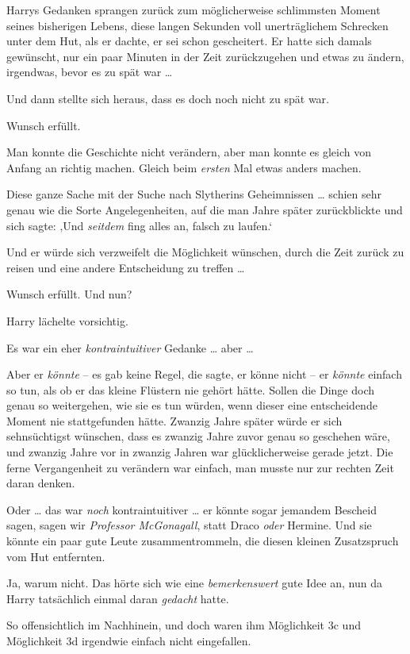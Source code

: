 Harrys Gedanken sprangen zurück zum möglicherweise schlimmsten Moment seines bisherigen Lebens, diese langen Sekunden voll unerträglichem Schrecken unter dem Hut, als er dachte, er sei schon gescheitert. Er hatte sich damals gewünscht, nur ein paar Minuten in der Zeit zurückzugehen und etwas zu ändern, irgendwas, bevor es zu spät war …

Und dann stellte sich heraus, dass es doch noch nicht zu spät war.

Wunsch erfüllt.

Man konnte die Geschichte nicht verändern, aber man konnte es gleich von Anfang an richtig machen. Gleich beim \emph{ersten} Mal etwas anders machen.

Diese ganze Sache mit der Suche nach Slytherins Geheimnissen … schien sehr genau wie die Sorte Angelegenheiten, auf die man Jahre später zurückblickte und sich sagte: ‚Und \emph{seitdem} fing alles an, falsch zu laufen.‘

Und er würde sich verzweifelt die Möglichkeit wünschen, durch die Zeit zurück zu reisen und eine andere Entscheidung zu treffen …

Wunsch erfüllt. Und nun?

Harry lächelte vorsichtig.

Es war ein eher \emph{kontraintuitiver} Gedanke … aber …

Aber er \emph{könnte} – es gab keine Regel, die sagte, er könne nicht – er \emph{könnte} einfach so tun, als ob er das kleine Flüstern nie gehört hätte. Sollen die Dinge doch genau so weitergehen, wie sie es tun würden, wenn dieser eine entscheidende Moment nie stattgefunden hätte. Zwanzig Jahre später würde er sich sehnsüchtigst wünschen, dass es zwanzig Jahre zuvor genau so geschehen wäre, und zwanzig Jahre vor in zwanzig Jahren war glücklicherweise gerade jetzt. Die ferne Vergangenheit zu verändern war einfach, man musste nur zur rechten Zeit daran denken.

Oder … das war \emph{noch} kontraintuitiver … er könnte sogar jemandem Bescheid sagen, sagen wir \emph{Professor McGonagall}, statt Draco \emph{oder} Hermine. Und sie könnte ein paar gute Leute zusammentrommeln, die diesen kleinen Zusatzspruch vom Hut entfernten.

Ja, warum nicht. Das hörte sich wie eine \emph{bemerkenswert} gute Idee an, nun da Harry tatsächlich einmal daran \emph{gedacht} hatte.

So offensichtlich im Nachhinein, und doch waren ihm Möglichkeit 3c und Möglichkeit 3d irgendwie einfach nicht eingefallen.

